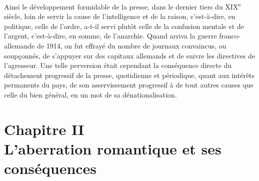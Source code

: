 \documentclass[french,twoside]{book} %
\newcommand\chapteropen{} %
\newcommand\chapterclose{} %
\renewcommand\chapteropen{} %
\renewcommand\chapterclose{} %
\begin{document}
Ainsi le développement formidable de la presse, dans le dernier tiers du XIX\textsuperscript{e} siècle, loin de servir la cause de l’intelligence et de la raison, c’est-à-dire, en politique, celle de l’ordre, a-t-il servi plutôt celle de la confusion mentale et de l’argent, c’est-à-dire, en somme, de l’anarchie. Quand arriva la guerre franco-allemande de 1914, on fut effrayé du nombre de journaux convaincus, ou soupçonnés, de s’appuyer sur des capitaux allemands et de suivre les directives de l’agresseur. Une telle perversion était cependant la conséquence directe du détachement progressif de la presse, quotidienne et périodique, quant aux intérêts permanents du pays, de son asservissement progressif à de tout autres causes que celle du bien général, en un mot de sa dénationalisation.
\chapterclose


\chapteropen
\chapter[Chapitre II. L’aberration romantique et ses conséquences]{Chapitre II{\hskip1pt}\\{}L’aberration romantique et ses conséquences}
\end{document}
